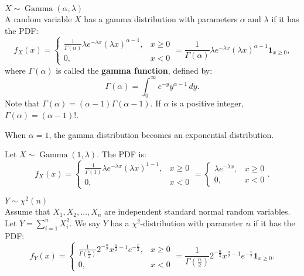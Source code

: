 \documentclass{huhtakm-template-book-v2}
\DeclareMathOperator{\Gam}{Gamma}
\begin{document}
    \begin{eg} $X \sim \Gam(\alpha,\lambda)$\\
        A random variable $X$ has a gamma distribution with parameters $\alpha$ and $\lambda$ if it has the PDF:
        \begin{equation*}
            f_{X}(x) = \begin{cases}
                \frac{1}{\Gamma(\alpha)}\lambda e^{-\lambda x}(\lambda x)^{\alpha-1}, &x \geq 0\\
                0, &x < 0
            \end{cases} = \frac{1}{\Gamma(\alpha)}\lambda e^{-\lambda x}(\lambda x)^{\alpha-1}\mathbf{1}_{x \geq 0},
        \end{equation*}
        where $\Gamma(\alpha)$ is called the \textbf{gamma function}, defined by:
        \begin{equation*}
            \Gamma(\alpha) = \int_{0}^{\infty}e^{-y}y^{\alpha-1}\,dy.
        \end{equation*}
        Note that $\Gamma(\alpha) = (\alpha-1)\Gamma(\alpha-1)$. If $\alpha$ is a positive integer, $\Gamma(\alpha) = (\alpha-1)!$.
    \end{eg}
    \begin{lem}
        When $\alpha = 1$, the gamma distribution becomes an exponential distribution.
    \end{lem}
    \begin{proofing}
        Let $X \sim \Gam(1,\lambda)$. The PDF is:
        \begin{equation*}
            f_{X}(x) = \begin{cases}
                \frac{1}{\Gamma(1)}\lambda e^{-\lambda x}(\lambda x)^{1-1}, &x \geq 0\\
                0, &x < 0
            \end{cases} = \begin{cases}
                \lambda e^{-\lambda x}, &x \geq 0\\
                0, &x < 0
            \end{cases}.
        \end{equation*}
    \end{proofing}
    \begin{eg} $Y \sim \chi^{2}(n)$\\
        Assume that $X_{1},X_{2},\dots,X_{n}$ are independent standard normal random variables. Let $Y = \sum_{i = 1}^{n}X_{i}^{2}$. We say $Y$ has a $\chi^{2}$-distribution with parameter $n$ if it has the PDF:
        \begin{equation*}
            f_{Y}(x) = \begin{cases}
                \frac{1}{\Gamma(\frac{n}{2})}2^{-\frac{n}{2}}x^{\frac{n}{2}-1}e^{-\frac{x}{2}}, &x \geq 0\\
                0, &x < 0
            \end{cases} = \frac{1}{\Gamma(\frac{n}{2})}2^{-\frac{n}{2}}x^{\frac{n}{2}-1}e^{-\frac{x}{2}}\mathbf{1}_{x \geq 0}.
        \end{equation*}
    \end{eg}
\end{document}
